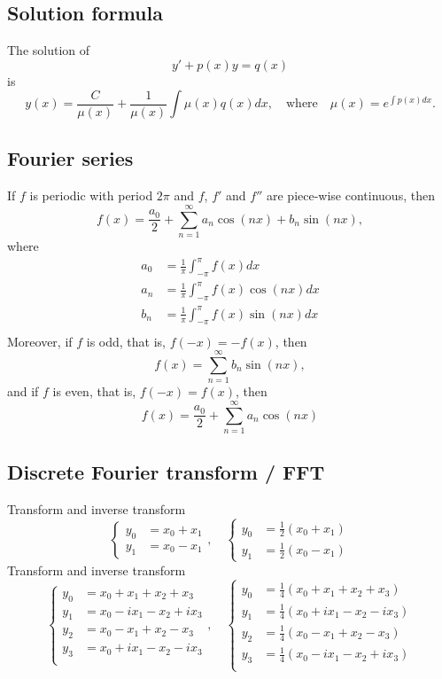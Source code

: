\documentclass[12pt]{article}
\begin{document}
\newpage
\subsection*{Solution formula}

The solution of
$$
y'+p(x)y=q(x)
$$
is
$$
y(x)=\frac{C}{\mu(x)}+\frac{1}{\mu(x)}\int \mu(x)q(x)dx,\quad\textrm{where}\quad
\mu(x)=e^{\int p(x)dx}.
$$

\subsection*{Fourier series}

If $f$ is periodic with period $2\pi$ and $f$, $f'$ and $f''$ are piece-wise continuous, then
$$
f(x)
=\frac{a_0}{2}
+\sum_{n=1}^\infty a_n\cos(nx)+b_n\sin(nx),
$$
where
\begin{equation*}
\begin{split}
a_0&=\frac{1}{\pi}\int_{-\pi}^{\pi}
f(x)dx\\
a_n&=\frac{1}{\pi}\int_{-\pi}^{\pi}
f(x)\cos(nx)dx\\
b_n&=\frac{1}{\pi}\int_{-\pi}^{\pi}
f(x)\sin(nx)dx\\
\end{split}
\end{equation*}
Moreover, if $f$ is odd, that is, $f(-x)=-f(x)$,
then
$$
f(x)
=\sum_{n=1}^\infty b_n\sin(nx),
$$
and if $f$ is even, that is, $f(-x)=f(x)$, then
$$
f(x)
=\frac{a_0}{2}
+\sum_{n=1}^\infty a_n\cos(nx)
$$

\subsection*{Discrete Fourier transform / FFT}

Transform and inverse transform
$$
\begin{cases}
y_0&=x_0+x_1\\
y_1&=x_0-x_1
\end{cases},\quad
\begin{cases}
y_0&=\frac{1}{2}(x_0+x_1)\\
y_1&=\frac{1}{2}(x_0-x_1)
\end{cases}
$$
Transform and inverse transform
$$
\begin{cases}
y_0&=x_0+x_1+x_2+x_3\\
y_1&=x_0-ix_1-x_2+ix_3\\
y_2&=x_0-x_1+x_2-x_3\\
y_3&=x_0+ix_1-x_2-ix_3\\
\end{cases},\quad
\begin{cases}
y_0&=\frac{1}{4}(x_0+x_1+x_2+x_3)\\
y_1&=\frac{1}{4}(x_0+ix_1-x_2-ix_3)\\
y_2&=\frac{1}{4}(x_0-x_1+x_2-x_3)\\
y_3&=\frac{1}{4}(x_0-ix_1-x_2+ix_3)\\
\end{cases}
$$

\newpage
\end{document}

